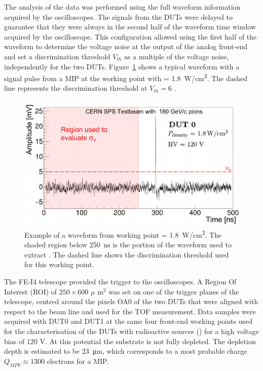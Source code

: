 		The analysis of the data was performed using the full waveform information acquired by the oscilloscopes. The signals from the DUTs were delayed to guarantee that they were always in the second half of the waveform time window acquired by the oscilloscope.
		This configuration allowed using the first half of the waveform to determine the voltage noise \noise at the output of the analog front-end and set a discrimination threshold $V_{th}$ as a multiple of the voltage noise, independently for the two DUTs. Figure~\ref{im:ATTRACT_waveform} shows a typical waveform with a signal pulse from a MIP at the working point with  \power = \SI{1.8}{\watt/\centi\meter^2}. The dashed line represents the discrimination threshold at $V_{th}=6$ \noise.

		\begin{figure}[h]
			\centering
			\includegraphics[width=0.75\linewidth]{files/ATTRACT_paper/Waveform_analysis}
			\caption{Example of a waveform from working point \power = \SI{1.8}{\watt/\centi\meter^2}. The shaded region below \SI{250}{\nano\second} is the portion of the waveform used to extract \noise. The dashed line shows the discrimination threshold used for this working point.}
			\label{im:ATTRACT_waveform} 
		\end{figure}

		The FE-I4 telescope provided the trigger to the oscilloscopes. A Region Of Interest (ROI) of $ 250 \times 600 $  $\mu$ m$^2$ was set on one of the trigger planes of the telescope, centred around the pixels OA0 of the two DUTs that were aligned with respect to the beam line and used for the TOF measurement.
		Data samples were acquired with DUT0 and DUT1 at the same four front-end working points used for the characterisation of the DUTs with radioactive sources () for a high voltage bias of 120 V. At this potential the substrate is not fully depleted. The depletion depth is estimated to be \SI{23}{\micro\meter}, which corresponds to a most probable charge $ Q_{MPV} \approx 1300 $ electrons for a MIP. 

